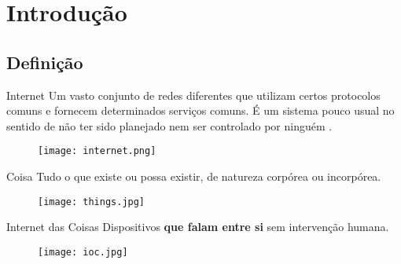 \section{Introdução}
\label{sec:introducao}

\subsection*{Definição}
\begin{frame}{}
	\begin{block}{Internet}	
		Um vasto conjunto de redes diferentes que utilizam certos protocolos comuns e fornecem determinados serviços comuns. É um sistema pouco usual no sentido de não ter sido planejado nem ser controlado por ninguém \cite{tanenbaum2011computer}.		
	\end{block}
	
	\begin{figure}[H]
		\texttt{[image: internet.png]}\footnotemark
	\end{figure}
	
\end{frame}

\begin{frame}{}
	\begin{block}{Coisa}	
		Tudo o que existe ou possa existir, de natureza corpórea ou incorpórea.
	\end{block}
	
	\begin{figure}[H]
		\texttt{[image: things.jpg]}\footnotemark
	\end{figure}
	
\end{frame}

\begin{frame}{}	
	\begin{block}{Internet das Coisas}	
		Dispositivos \textbf{que falam entre si} sem intervenção humana.
	\end{block}
	
	\begin{figure}[H]
		\texttt{[image: ioc.jpg]}\footnotemark
	\end{figure}
	
\end{frame}

